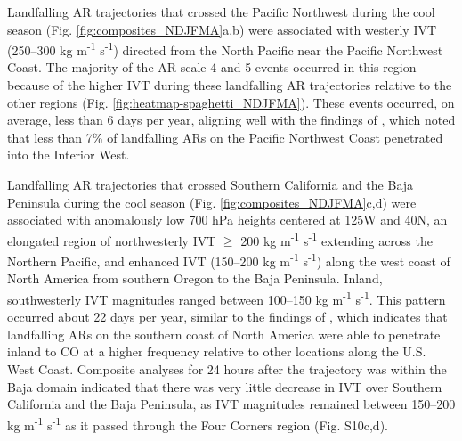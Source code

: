 \documentclass[draft]{agujournal2019}
\begin{document}

Landfalling AR trajectories that crossed the Pacific Northwest during the cool season (Fig. \ref{fig:composites_NDJFMA}a,b) were associated with westerly IVT (250--300 kg m\textsuperscript{-1} s\textsuperscript{-1}) directed from the North Pacific near the Pacific Northwest Coast. The majority of the AR scale 4 and 5 events occurred in this region because of the higher IVT during these landfalling AR trajectories relative to the other regions (Fig. \ref{fig:heatmap-spaghetti_NDJFMA}). These events occurred, on average, less than 6 days per year, aligning well with the findings of , which noted that less than 7\% of landfalling ARs on the Pacific Northwest Coast penetrated into the Interior West. 

Landfalling AR trajectories that crossed Southern California and the Baja Peninsula during the cool season (Fig. \ref{fig:composites_NDJFMA}c,d) were associated with anomalously low 700 hPa heights centered at 125\textdegree W and 40\textdegree N, an elongated region of northwesterly IVT $\geq$ 200 kg m\textsuperscript{-1} s\textsuperscript{-1} extending across the Northern Pacific, and enhanced IVT (150--200 kg m\textsuperscript{-1} s\textsuperscript{-1}) along the west coast of North America from southern Oregon to the Baja Peninsula. Inland, southwesterly IVT magnitudes ranged between 100--150 kg m\textsuperscript{-1} s\textsuperscript{-1}. This pattern occurred about 22 days per year, similar to the findings of , which indicates that landfalling ARs on the southern coast of North America were able to penetrate inland to CO at a higher frequency relative to other locations along the U.S. West Coast. Composite analyses for 24 hours after the trajectory was within the Baja domain indicated that there was very little decrease in IVT over Southern California and the Baja Peninsula, as IVT magnitudes remained between 150--200 kg m\textsuperscript{-1} s\textsuperscript{-1} as it passed through the Four Corners region (Fig. S10c,d). 

\end{document}
